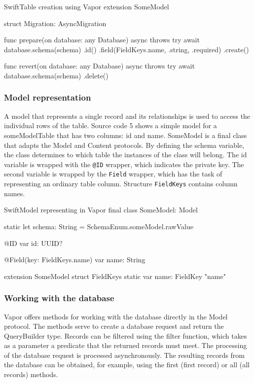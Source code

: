 \documentclass[
  biblatex = false,
  language=english,
  figures=false,
  sourcecodes,
  glossaries,
  index
]{kidiplom}
\begin{document}
\FloatBarrier
\begin{kicode}{Swift}{}{Table creation using Vapor}
extension SomeModel {
    struct Migration: AsyncMigration {
        
        func prepare(on database: any Database) async throws {
            try await database.schema(schema)
                .id()
                .field(FieldKeys.name, .string, .required)
                .create()
        }
        
        func revert(on database: any Database) async throws {
            try await database.schema(schema)
                .delete()
        }
    }
}
\end{kicode}
\FloatBarrier

\subsubsection{Model representation}
A model \cite{bib6} that represents a single record and its relationships is used to access the individual rows of the table. Source code 5 shows a simple model for a someModelTable that has two columns: id and name. SomeModel is a final class that adapts the Model and Content protocols. By defining the schema variable, the class determines to which table the instances of the class will belong. The id variable is wrapped with the \texttt{@ID} wrapper, which indicates the private key. The second variable is wrapped by the \texttt{Field} wrapper, which has the task of representing an ordinary table column. Structure \texttt{FieldKeys} contains column names.

\FloatBarrier
\begin{kicode}{Swift}{}{Model representing in Vapor}
final class SomeModel: Model {
    
    static let schema: String = SchemaEnum.someModel.rawValue
    
    @ID
    var id: UUID?
    
    @Field(key: FieldKeys.name)
    var name: String
}
extension SomeModel {
    struct FieldKeys {
        static var name: FieldKey {"name"}
    }
}
\end{kicode}
\FloatBarrier

\subsubsection{Working with the database}
Vapor offers methods for working with the database directly in the Model protocol. The methods serve to create a database request and return the QueryBuilder type. Records can be filtered using the filter function, which takes as a parameter a predicate that the returned records must meet. The processing of the database request is processed asynchronously. The resulting records from the database can be obtained, for example, using the first (first record) or all (all records) methods.
\end{document}

